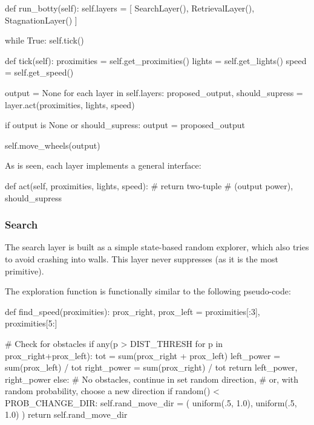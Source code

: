 \documentclass[a4paper,10pt]{article}
\begin{document}
\begin{python}
def run_botty(self):
    self.layers = [
        SearchLayer(),
        RetrievalLayer(),
        StagnationLayer()
    ]

    while True:
        self.tick()

def tick(self):
    proximities = self.get_proximities()
    lights      = self.get_lights()
    speed       = self.get_speed()

    output = None
    for each layer in self.layers:
        proposed_output, should_supress = layer.act(proximities, 
                                                    lights, speed)

        if output is None or should_supress:
            output = proposed_output

    self.move_wheels(output)
\end{python}

As is seen, each layer implements a general interface: 
\begin{python}
def act(self, proximities, lights, speed):
    # return two-tuple 
    # (output power), should_supress
\end{python}

\subsubsection{Search}
The search layer is built as a simple state-based random explorer, which also
tries to avoid crashing into walls.  This layer never suppresses (as it is the
most primitive). 

The exploration function is functionally similar to the following pseudo-code:

\begin{python}
def find_speed(proximities):
    prox_right, prox_left = proximities[:3], proximities[5:]

    # Check for obstacles
    if any(p > DIST_THRESH for p in prox_right+prox_left):
        tot         = sum(prox_right + prox_left)
        left_power  = sum(prox_left)  / tot
        right_power = sum(prox_right) / tot
        return left_power, right_power
    else:
        # No obstacles, continue in set random direction,
        # or, with random probability, choose a new direction
        if random() < PROB_CHANGE_DIR:
            self.rand_move_dir = (
                uniform(.5, 1.0), 
                uniform(.5, 1.0)
            )
        return self.rand_move_dir
\end{python}
\end{document}
